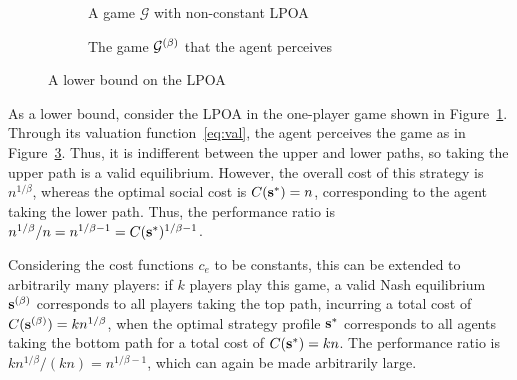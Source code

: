 \documentclass[twoside]{article}
\begin{document}
\begin{multicols}{2}
\begin{figure}[H]
\begin{subfigure}[b]{\linewidth}
    \caption{A game $\mathcal{G}$ with non-constant LPOA}
    \label{fig:lower}
  \end{subfigure}

  \begin{subfigure}[b]{\linewidth}
    \centering
    \caption{The game $\mathcal{G}^{(\beta)}$ that the agent perceives}
    \label{fig:lowerbet}
  \end{subfigure}
  \caption{A lower bound on the LPOA}
\end{figure}

As a lower bound, consider the LPOA in the one-player game shown in
Figure~\ref{fig:lower}. Through its valuation function~\eqref{eq:val}, the agent
perceives the game as in Figure~\ref{fig:lowerbet}. Thus, it is indifferent
between the upper and lower paths, so taking the upper path is a valid
equilibrium. However, the overall cost of this strategy is $n^{1/\beta}$,
whereas the optimal social cost is $C(\mathbf{s}^*) = n$, corresponding to the agent
taking the lower path. Thus, the performance ratio is $n^{1/\beta}/n =
n^{1/\beta-1} = C(\mathbf{s}^*)^{1/\beta-1}$.

Considering the cost functions $c_e$ to be constants, this can be extended to
arbitrarily many players: if $k$ players play this game, a valid Nash
equilibrium $\mathbf{s}^{(\beta)}$ corresponds to all players taking the top path, incurring
a total cost of $C(\mathbf{s}^{(\beta)}) = kn^{1/\beta}$, when the optimal strategy profile
$\mathbf{s}^*$ corresponds to all agents taking the bottom path for a total cost of
$C(\mathbf{s}^*) = kn$. The performance ratio is $kn^{1/\beta}/(kn) = n^{1/\beta-1}$,
which can again be made arbitrarily large.


\end{multicols}
\end{document}
